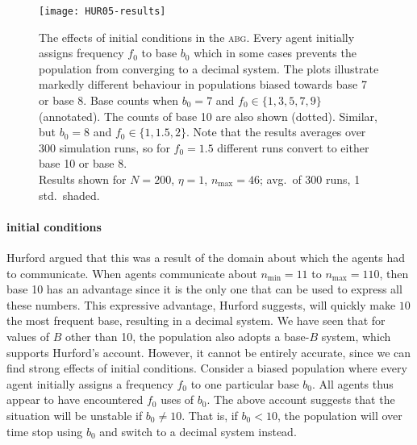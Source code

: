 \documentclass{../src/bcthesispart}
\begin{document}
\begin{SCfigure}
	\texttt{[image: HUR05-results]}	
	\caption{The effects of initial conditions in the \textsc{abg}. Every agent initially assigns frequency $f_0$ to base $b_0$ which in some cases prevents the population from converging to a decimal system.
		The plots illustrate markedly different behaviour in populations biased towards base 7 or base 8.
		 Base counts when $b_0=7$ and $f_0 \in \{1, 3, 5, 7, 9\}$ (annotated). The counts of base 10 are also shown (dotted). 
		 Similar, but $b_0=8$ and $f_0 \in \{1, 1.5,2\}$.
			Note that the results averages over 300 simulation runs, so for $f_0=1.5$ different runs convert to either base 10 or base 8.
		\\[1em]
		Results shown for $N=200$, $\eta=1$, $n_{\text{max}}=46$; avg.\ of 300 runs, 1 std.\ shaded.
		\label{fig:effect-initial-conditions}}
\end{SCfigure}



\paragraph{initial conditions}
Hurford argued that this was a result of the domain about which the agents had to communicate.
When agents communicate about $n_{\text{min}}=11$ to $n_{\text{max}} = 110$, then base 10 has an advantage since it is the only one that can be used to express all these numbers. 
This expressive advantage, Hurford suggests, will quickly make $10$ the most frequent base, resulting in a decimal system. 
We have seen that for values of $B$ other than 10, the population also adopts a base-$B$ system, which supports Hurford's account. 
However, it cannot be entirely accurate, since we can find strong effects of initial conditions.
Consider a biased population where every agent initially assigns a frequency $f_0$ to one particular base $b_0$.
All agents thus appear to have encountered $f_0$ uses of $b_0$.
The above account suggests that the situation will be unstable if $b_0\neq 10$. That is, if $b_0<10$, the population will over time stop using $b_0$ and switch to a decimal system instead. 
\end{document}
